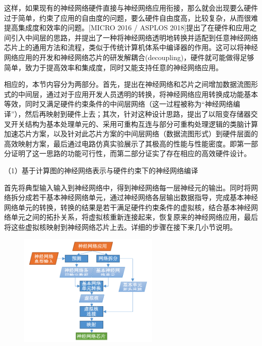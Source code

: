 这样，如果现有的神经网络硬件直接与神经网络应用衔接，那么就会出现要么硬件过于简单，约束了应用的自由度的问题，要么硬件自由度高，比较复杂，从而很难提高集成度和效率的问题。[MICRO 2016 / ASPLOS 2018]提出了在硬件和应用之间引入中间层的思路，并提出了一种将神经网络透明地转换并适配到任意神经网络芯片上的通用方法和流程，类似于传统计算机体系中编译器的作用。这可以将神经网络应用的开发和神经网络芯片的研发解耦合(decoupling)，硬件就可能做得足够简单，致力于提高效率和集成度，同时又能支持任意的神经网络应用。

相应的，本节内容分为两部分。首先，提出在神经网络和芯片之间增加数据流图形式的中间层，通过对于应用开发人员透明的转换，将神经网络应用转换成功能基本等效，同时又满足硬件约束条件的中间层网络（这一过程被称为“神经网络编译”），然后再映射到硬件上去；其次，针对这种设计思路，提出了以阻变存储器交叉开关结构为基本处理单元的、采用可重构互连与部分可重构处理逻辑的类脑计算加速芯片方案，以及针对此芯片方案的中间层网络（数据流图形式）到硬件层面的高效映射方案，最后通过电路仿真实验展示了其极高的性能与性能密度。即第一部分证明了这一思路的功能可行性，而第二部分证实了存在相应的高效硬件设计。

（1）基于计算图的神经网络表示与硬件约束下的神经网络编译

首先将典型输入输入到神经网络中，得到神经网络每一层神经元的输出。同时将网络拆分成若干基本神经网络单元，通过神经网络各层输出数据指导，完成基本神经网络单元的转换，转换的结果是若干满足硬件约束条件的虚拟核，结合基本神经网络单元之间的拓扑关系，将虚拟核重新连接起来，恢复原来的神经网络应用，最后将这些虚拟核映射到神经网络芯片上去。详细的步骤在接下来几小节说明。

\begin{figure}[!htbp]
    \centering
    \includegraphics[width=0.60\textwidth]{Img/Chap_Application/Zhang/Systemflow.png}
    \label{fig:Systemflow}
\end{figure}



